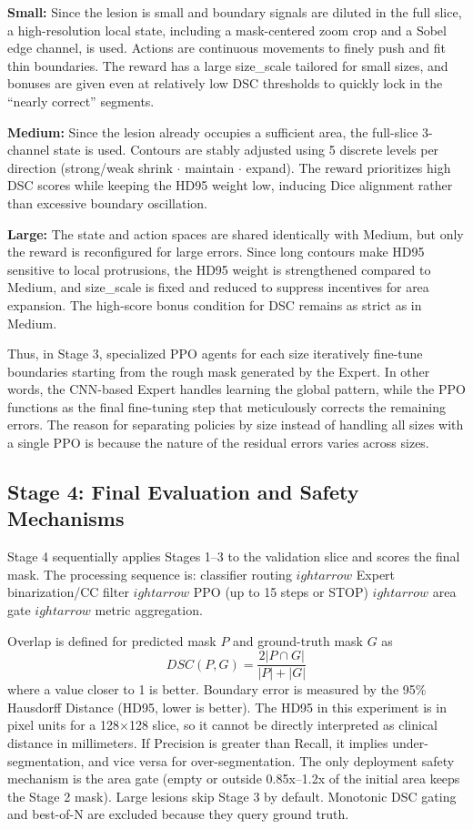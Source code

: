 \documentclass[11pt,a4paper]{article}
\begin{document}
\textbf{Small:} Since the lesion is small and boundary signals are diluted in the full slice, a high-resolution local state, including a mask-centered zoom crop and a Sobel edge channel, is used. Actions are continuous movements to finely push and fit thin boundaries. The reward has a large size\_scale tailored for small sizes, and bonuses are given even at relatively low DSC thresholds to quickly lock in the ``nearly correct'' segments.

\textbf{Medium:} Since the lesion already occupies a sufficient area, the full-slice 3-channel state is used. Contours are stably adjusted using 5 discrete levels per direction (strong/weak shrink $\cdot$ maintain $\cdot$ expand). The reward prioritizes high DSC scores while keeping the HD95 weight low, inducing Dice alignment rather than excessive boundary oscillation.

\textbf{Large:} The state and action spaces are shared identically with Medium, but only the reward is reconfigured for large errors. Since long contours make HD95 sensitive to local protrusions, the HD95 weight is strengthened compared to Medium, and size\_scale is fixed and reduced to suppress incentives for area expansion. The high-score bonus condition for DSC remains as strict as in Medium.

Thus, in Stage 3, specialized PPO agents for each size iteratively fine-tune boundaries starting from the rough mask generated by the Expert. In other words, the CNN-based Expert handles learning the global pattern, while the PPO functions as the final fine-tuning step that meticulously corrects the remaining errors. The reason for separating policies by size instead of handling all sizes with a single PPO is because the nature of the residual errors varies across sizes.

\subsection{Stage 4: Final Evaluation and Safety Mechanisms}
Stage 4 sequentially applies Stages 1--3 to the validation slice and scores the final mask. The processing sequence is: classifier routing $
ightarrow$ Expert binarization/CC filter $
ightarrow$ PPO (up to 15 steps or STOP) $
ightarrow$ area gate $
ightarrow$ metric aggregation.

Overlap is defined for predicted mask $P$ and ground-truth mask $G$ as
\begin{equation}
DSC(P,G) = \frac{2|P \cap G|}{|P| + |G|}
\end{equation}
where a value closer to 1 is better.
Boundary error is measured by the 95\% Hausdorff Distance (HD95, lower is better).
The HD95 in this experiment is in pixel units for a 128$\times$128 slice, so it cannot be directly interpreted as clinical distance in millimeters. If Precision is greater than Recall, it implies under-segmentation, and vice versa for over-segmentation. The only deployment safety mechanism is the area gate (empty or outside 0.85x--1.2x of the initial area keeps the Stage 2 mask). Large lesions skip Stage 3 by default. Monotonic DSC gating and best-of-N are excluded because they query ground truth.
\end{document}
